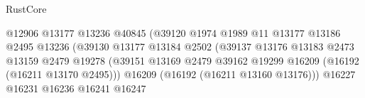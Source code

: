 \begin{lexlean}{RustCore}
\begin{coremodule}
                                                          @12906
                                                          @13177
                                                          @13236
                                                          @40845
                                                          (@39120
                                                            @1974
                                                            @1989
                                                            @11
                                                            @13177
                                                            @13186
                                                            @2495
                                                            @13236
                                                            (@39130
                                                              @13177
                                                              @13184
                                                              @2502
                                                              (@39137
                                                                @13176
                                                                @13183
                                                                @2473
                                                                @13159
                                                                @2479
                                                                @19278
                                                                (@39151
                                                                  @13169
                                                                  @2479
                                                                  @39162
                                                                  @19299
                                                                  @16209
                                                                  (@16192 (@16211 @13170 @2495)))
                                                                @16209
                                                                (@16192 (@16211 @13160 @13176)))
                                                              @16227
                                                              @16231
                                                              @16236
                                                              @16241
                                                              @16247

\end{coremodule}
\end{lexlean}
